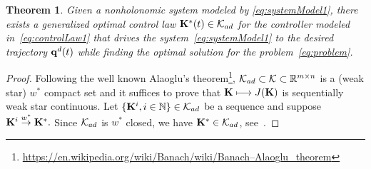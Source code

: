 \documentclass[
12pt,draftcls,onecolumn%
]{IEEEtran}
\newtheorem{theorem}{Theorem}
\begin{document}
\begin{theorem}\label{thm:existence-K}
Given a nonholonomic system modeled by \eqref{eq:systemModel1}, there exists a generalized optimal control law ${\bf K}^*(t) \in {\cal K}_{ad}$ for the controller modeled in~\eqref{eq:controlLaw1} that drives the system~\eqref{eq:systemModel1} to the desired trajectory ${\bf q}^d(t)$ while finding the optimal solution for the problem~\eqref{eq:problem}. 
\end{theorem}
 \begin{proof} 
Following the well known Alaoglu's theorem\footnote{\href{https://en.wikipedia.org/wiki/Banach/wiki/Banach–Alaoglu_theorem}{https://en.wikipedia.org/wiki/Banach/wiki/Banach–Alaoglu\_theorem}},  ${\cal K}_{ad} \subset {\cal K}\subset\mathbb{R}^{m\times n}$  is a (weak star) $w^*$ compact set and it suffices to prove that ${\bf K} \longmapsto J({\bf K})$ is sequentially weak star continuous. Let $\{{\bf K}^i, i \in \mathbb{N}\} \in {\cal K}_{ad}$ be a sequence  and suppose   ${\bf K}^i \buildrel w^* \over \to {\bf K}^*.$ Since ${\cal K}_{ad}$ is $w^*$ closed,  we have ${\bf K}^* \in {\cal K}_{ad}$, see~\cite{AhMi2011-j1}. 


\end{proof}
\end{document}
